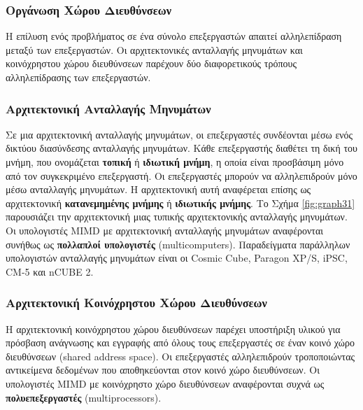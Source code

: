 \documentclass[12pt,a4paper]{article} %
\begin{document}
\subsubsection{Οργάνωση Χώρου Διευθύνσεων}
Η επίλυση ενός προβλήματος σε ένα σύνολο επεξεργαστών απαιτεί 
αλληλεπίδραση μεταξύ των επεξεργαστών. Οι αρχιτεκτονικές ανταλλαγής 
μηνυμάτων και κοινόχρηστου χώρου διευθύνσεων παρέχουν δύο διαφορετικούς 
τρόπους αλληλεπίδρασης των επεξεργαστών.

\subsubsection*{Αρχιτεκτονική Ανταλλαγής Μηνυμάτων}
Σε μια αρχιτεκτονική ανταλλαγής μηνυμάτων, οι επεξεργαστές συνδέονται 
μέσω ενός δικτύου διασύνδεσης ανταλλαγής μηνυμάτων.  Κάθε επεξεργαστής 
διαθέτει τη δική του μνήμη, που ονομάζεται \textbf{τοπική} ή \textbf{ιδιωτική μνήμη}, 
η οποία είναι προσβάσιμη μόνο από τον συγκεκριμένο επεξεργαστή. Οι 
επεξεργαστές μπορούν να αλληλεπιδρούν μόνο μέσω ανταλλαγής μηνυμάτων.  
Η αρχιτεκτονική αυτή αναφέρεται επίσης ως αρχιτεκτονική \textbf{κατανεμημένης μνήμης} 
ή \textbf{ιδιωτικής μνήμης}. Το Σχήμα \ref{fig:graph31} παρουσιάζει την αρχιτεκτονική 
μιας τυπικής αρχιτεκτονικής ανταλλαγής μηνυμάτων. Οι υπολογιστές MIMD 
με αρχιτεκτονική ανταλλαγής μηνυμάτων αναφέρονται συνήθως ως 
\textbf{πολλαπλοί υπολογιστές} (multicomputers). Παραδείγματα παράλληλων υπολογιστών ανταλλαγής 
μηνυμάτων είναι οι Cosmic Cube, Paragon XP/S, iPSC, CM-5 και nCUBE 2.

\subsubsection*{Αρχιτεκτονική Κοινόχρηστου Χώρου Διευθύνσεων}
Η αρχιτεκτονική κοινόχρηστου χώρου διευθύνσεων παρέχει υποστήριξη υλικού 
για πρόσβαση ανάγνωσης και εγγραφής από όλους τους επεξεργαστές σε έναν 
κοινό χώρο διευθύνσεων (shared address space). Οι επεξεργαστές αλληλεπιδρούν τροποποιώντας 
αντικείμενα δεδομένων που αποθηκεύονται στον κοινό χώρο διευθύνσεων. 
Οι υπολογιστές MIMD με κοινόχρηστο χώρο 
διευθύνσεων αναφέρονται συχνά ως \textbf{πολυεπεξεργαστές} (multiprocessors).
\end{document}

